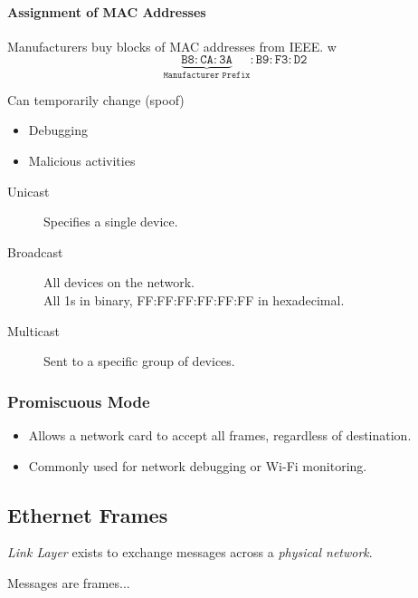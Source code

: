 \documentclass{article}
\begin{document}
\paragraph*{Assignment of MAC Addresses}
Manufacturers buy blocks of MAC addresses from IEEE.
w
\begin{equation*}
    \mathtt{\underbrace{B8:CA:3A}_{\text{Manufacturer Prefix}}:B9:F3:D2}
\end{equation*}

Can temporarily change (spoof)
\begin{itemize}
    \item Debugging
    \item Malicious activities
\end{itemize}

\begin{description}
    \item[Unicast] Specifies a single device.
    \item[Broadcast] All devices on the network. \\
          All 1s in binary, FF:FF:FF:FF:FF:FF in hexadecimal.
    \item[Multicast] Sent to a specific group of devices.
\end{description}

\subsubsection*{Promiscuous Mode}
\begin{itemize}
    \item Allows a network card to accept all frames, regardless of destination.
    \item Commonly used for network debugging or Wi-Fi monitoring.
\end{itemize}

\subsection*{Ethernet Frames}
\emph{Link Layer} exists to exchange messages across a \textit{physical
    network}.

Messages are frames...
\end{document}
